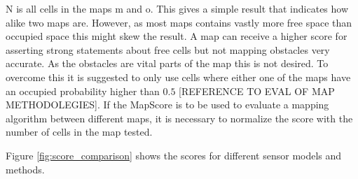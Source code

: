 N is all cells in the maps m and o. 
This gives a simple result that indicates how alike two maps are. 
However, as most maps contains vastly more free space than occupied space this might skew the result. 
A map can receive a higher score for asserting strong statements about free cells but not mapping obstacles very accurate. 
As the obstacles are vital parts of the map this is not desired. 
To overcome this it is suggested to only use cells where either one of the maps have an occupied probability higher than \(0.5\) [REFERENCE TO EVAL OF MAP METHODOLEGIES]. 
If the MapScore is to be used to evaluate a mapping algorithm between different maps, it is necessary to normalize the score with the number of cells in the map tested. 

Figure \ref{fig:score_comparison} shows the scores for different sensor models and methods. 

